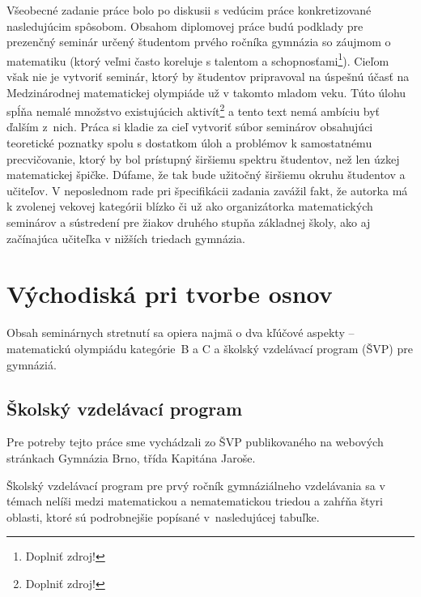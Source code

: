 \documentclass[11pt,a4paper,oneside,final]{book}
\begin{document}
Všeobecné zadanie práce bolo po diskusii s vedúcim práce konkretizované nasledujúcim spôsobom. Obsahom diplomovej práce budú podklady pre prezenčný seminár určený študentom prvého ročníka gymnázia so záujmom o matematiku (ktorý veľmi často koreluje s talentom a schopnosťami\footnote{Doplniť zdroj!}). Cieľom však nie je vytvoriť seminár, ktorý by študentov pripravoval na úspešnú účasť na Medzinárodnej matematickej olympiáde už v takomto mladom veku. Túto úlohu spĺňa nemalé množstvo existujúcich aktivít\footnote{Doplniť zdroj!} a tento text nemá ambíciu byť ďalším z~nich. Práca si kladie za cieľ vytvoriť súbor seminárov obsahujúci teoretické poznatky spolu s dostatkom úloh a problémov k samostatnému precvičovanie, ktorý by bol prístupný širšiemu spektru študentov, než len úzkej matematickej špičke. Dúfame, že tak bude užitočný širšiemu okruhu študentov a učiteľov. V neposlednom rade pri špecifikácii zadania zavážil fakt, že autorka má k zvolenej vekovej kategórii blízko či už ako organizátorka matematických seminárov a sústredení pre žiakov druhého stupňa základnej školy, ako aj začínajúca učiteľka v nižších triedach gymnázia.

\section{Východiská pri tvorbe osnov}
Obsah seminárnych stretnutí sa opiera najmä o dva kľúčové aspekty -- matematickú olympiádu kategórie~B a C a školský vzdelávací program (ŠVP) pre gymnáziá.

\subsection{Školský vzdelávací program}

Pre potreby tejto práce sme vychádzali zo ŠVP publikovaného na webových stránkach Gymnázia Brno, třída Kapitána Jaroše.

Školský vzdelávací program pre prvý ročník gymnáziálneho vzdelávania sa v témach nelíši medzi matematickou a nematematickou triedou a zahŕňa štyri oblasti, ktoré sú podrobnejšie popísané v~nasledujúcej tabuľke.
\end{document}

